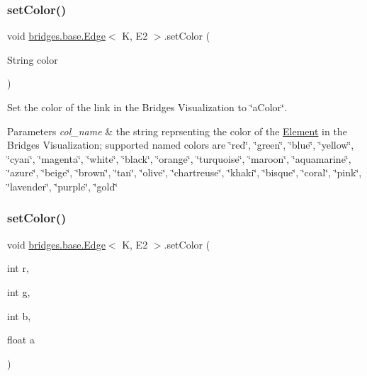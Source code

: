 \subsubsection{\texorpdfstring{setColor()}{setColor()}\hspace{0.1cm}{\footnotesize\ttfamily [2/3]}}
{\footnotesize\ttfamily void \mbox{\hyperlink{classbridges_1_1base_1_1_edge}{bridges.\+base.\+Edge}}$<$ K, E2 $>$.set\+Color (\begin{DoxyParamCaption}\item[{String}]{color }\end{DoxyParamCaption})}

Set the color of the link in the Bridges Visualization to \char`\"{}a\+Color\char`\"{}.


\begin{DoxyParams}{Parameters}
{\em col\+\_\+name} & the string reprsenting the color of the \mbox{\hyperlink{classbridges_1_1base_1_1_element}{Element}} in the Bridges Visualization; supported named colors are \char`\"{}red\char`\"{}, \char`\"{}green\char`\"{}, \char`\"{}blue\char`\"{}, \char`\"{}yellow\char`\"{}, \char`\"{}cyan\char`\"{}, \char`\"{}magenta\char`\"{}, \char`\"{}white\char`\"{}, \char`\"{}black\char`\"{}, \char`\"{}orange\char`\"{}, \char`\"{}turquoise\char`\"{}, \char`\"{}maroon\char`\"{}, \char`\"{}aquamarine\char`\"{}, \char`\"{}azure\char`\"{}, \char`\"{}beige\char`\"{}, \char`\"{}brown\char`\"{}, \char`\"{}tan\char`\"{}, \char`\"{}olive\char`\"{}, \char`\"{}chartreuse\char`\"{}, \char`\"{}khaki\char`\"{}, \char`\"{}bisque\char`\"{}, \char`\"{}coral\char`\"{}, \char`\"{}pink\char`\"{}, \char`\"{}lavender\char`\"{}, \char`\"{}purple\char`\"{}, \char`\"{}gold\char`\"{} \\
\hline
\end{DoxyParams}
\mbox{\label{classbridges_1_1base_1_1_edge_a4ecf6bdaf140202b41c8a929fbdcdc0c}} 
\subsubsection{\texorpdfstring{setColor()}{setColor()}\hspace{0.1cm}{\footnotesize\ttfamily [3/3]}}
{\footnotesize\ttfamily void \mbox{\hyperlink{classbridges_1_1base_1_1_edge}{bridges.\+base.\+Edge}}$<$ K, E2 $>$.set\+Color (\begin{DoxyParamCaption}\item[{int}]{r,  }\item[{int}]{g,  }\item[{int}]{b,  }\item[{float}]{a }\end{DoxyParamCaption})}

